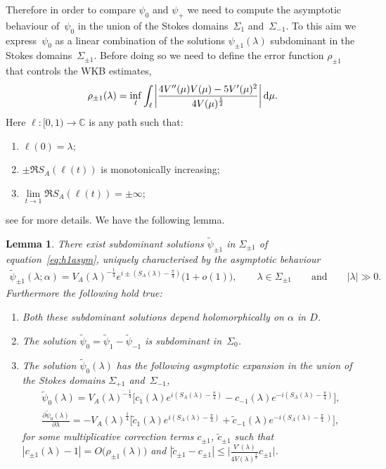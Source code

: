 \documentclass[pdftex]{sigma}
\numberwithin{equation}{section}
\newtheorem{lem}[thm]{Lemma}
\newcommand{\bb}[1]{\mathbb{ #1 }}
\newcommand{\la}{\lambda}
\newcommand{\al}{\alpha}
\begin{document}
Therefore in order to compare $\psi_0$ and $\psi_+$ we need to compute the asymptotic behaviour of~$\psi_0$ in the union of the Stokes domains~$\Sigma_1$ and~$\Sigma_{-1}$. To this aim we express~$\psi_0$ as a linear combination of the solutions $\psi_{\pm1}(\la)$ subdominant in the Stokes domains~$\Sigma_{\pm1}$. Before doing so we need to def\/ine the error function $\rho_{\pm1}$ that controls the WKB estimates,
\begin{gather*}%
\rho_{\pm1}(\la)=\inf_{\ell}\int_{\ell}\left|\frac{4V''(\mu)V(\mu)-5V'(\mu)^2}{4 V(\mu)^{\frac52}}\right|{\rm d}\mu.
\end{gather*}
Here $\ell\colon [0,1) \to \bb{C}$ is any path such that:
\begin{enumerate}[label=(\roman*)]\itemsep=0pt
	\item $\ell(0)=\la$;
	\item $\pm \Re S_A(\ell(t))$ is monotonically increasing;
	\item $\lim\limits_{t\to 1}\Re S_A(\ell(t))=\pm \infty$;
\end{enumerate}
see \cite{piwkb} for more details. We have the following lemma.
\begin{lem}\label{lem:wkbturning}
	There exist subdominant solutions $\widetilde{\psi}_{\pm1}$ in $\Sigma_{\pm1}$ of equation~\eqref{eq:h1asym}, uniquely cha\-racterised by the asymptotic behaviour
	\begin{gather*}
	\widetilde{\psi}_{\pm1}(\la;\al)=V_A(\la)^{-\frac14}e^{i \pm ( S_A(\la)-\frac{\pi}{4}) } \big (1 + o(1) \big), \qquad \la \in
	\Sigma_{\pm1} \qquad \mbox{and} \qquad |\la|\gg0 .
	\end{gather*}
	Furthermore the following hold true:
	\begin{enumerate}[label={\rm (\roman*)}]\itemsep=0pt
\item	Both these subdominant solutions depend holomorphically on $\alpha$ in $D$.
\item The solution $\widetilde{\psi}_0=\widetilde{\psi}_1-\widetilde{\psi}_{-1}$ is subdominant in~$\Sigma_0$.
\item The solution $\widetilde{\psi}_0(\la)$ has the following asymptotic expansion in the union of the Stokes domains
		$\Sigma_{+1}$ and~$\Sigma_{-1}$,
		\begin{gather}\nonumber
		\widetilde{\psi}_0(\la) =V_A(\la)^{-\frac14}\big[c_1(\la) e^{i ( S_A(\la)-\frac{\pi}{4})}
		-c_{-1}(\la)e^{-i(S_A(\la)-\frac{\pi}{4})}\big],\\ \label{eq:basicwkb}
		\frac{\partial \widetilde{\psi}_0(\la)}{\partial \la} =-V_A(\la)^{\frac14}\big[\tilde{c}_1(\la) e^{i ( S_A(\la)-\frac{\pi}{4} )}+
		\tilde{c}_{-1}(\la)e^{-i (S_A(\la)-\frac{\pi}{4}\ )}\big],
		\end{gather}
		for some multiplicative correction terms $c_{\pm1}$, $\tilde{c}_{\pm1}$ such that $|c_{\pm1}(\la)-1|=O\big(\rho_{\pm1}(\la)\big) $ and $|\tilde{c}_{\pm1}-c_{\pm1}|\leq \big|\frac{V'(\la)}{4 V(\la)^{\frac32}} c_{\pm1}\big|$.
	\end{enumerate}
\end{lem}
\end{document}
